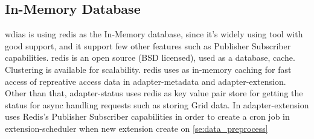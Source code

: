 \subsection{In-Memory Database}
\label{subse:redis}
\acrshort{wdias} is using \acrshort{redis} \cite{redisRedisDocumentation} as the In-Memory database, since it's widely using tool with good support, and it support few other features such as Publisher Subscriber capabilities.
\acrshort{redis} is an open source (BSD licensed), used as a database, cache. Clustering is available for scalability.
\acrshort{redis} uses as in-memory caching for fast access of repreative access data in adapter-metadata and adapter-extension.
Other than that, adapter-status uses \acrshort{redis} as key value pair store for getting the status for async handling requests such as storing Grid data.
In adapter-extension uses Redis's Publisher Subscriber capabilities in order to create a cron job in extension-scheduler when new extension create on \cref{se:data_preprocess}

